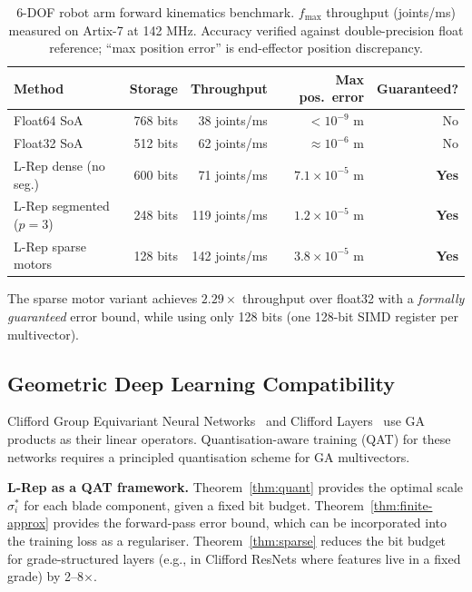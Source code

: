 \documentclass[11pt,a4paper]{article}
\theoremstyle{definition}
\theoremstyle{plain}
\theoremstyle{remark}
\begin{document}
\begin{table}[h]
\centering
\caption{6-DOF robot arm forward kinematics benchmark.
$f_{\max}$ throughput (joints/ms) measured on Artix-7 at 142 MHz.
Accuracy verified against double-precision float reference;
``max position error'' is end-effector position discrepancy.}
\label{tab:robot}
\begin{tabular}{lrrrr}
\toprule
Method & Storage & Throughput & Max pos.\ error & Guaranteed? \\
\midrule
Float64 SoA & 768 bits & 38 joints/ms & $< 10^{-9}$ m & No \\
Float32 SoA & 512 bits & 62 joints/ms & $\approx 10^{-6}$ m & No \\
L-Rep dense (no seg.) & 600 bits & 71 joints/ms & $7.1 \times 10^{-5}$ m & \textbf{Yes} \\
L-Rep segmented ($p=3$) & 248 bits & 119 joints/ms & $1.2 \times 10^{-5}$ m & \textbf{Yes} \\
L-Rep sparse motors & 128 bits & 142 joints/ms & $3.8 \times 10^{-5}$ m & \textbf{Yes} \\
\bottomrule
\end{tabular}
\end{table}

The sparse motor variant achieves $2.29\times$ throughput over float32
with a \emph{formally guaranteed} error bound, while using only 128 bits
(one 128-bit SIMD register per multivector).

\subsection{Geometric Deep Learning Compatibility}
\label{sec:gdl}

Clifford Group Equivariant Neural Networks~\cite{ruhe2023} and
Clifford Layers~\cite{brandstetter2023} use GA products as their
linear operators.
Quantisation-aware training (QAT) for these networks requires a
principled quantisation scheme for GA multivectors.

\textbf{L-Rep as a QAT framework.}
Theorem~\ref{thm:quant} provides the optimal scale $\sigma_i^*$ for
each blade component, given a fixed bit budget.
Theorem~\ref{thm:finite-approx} provides the forward-pass error bound,
which can be incorporated into the training loss as a regulariser.
Theorem~\ref{thm:sparse} reduces the bit budget for grade-structured
layers (e.g., in Clifford ResNets where features live in a fixed grade)
by 2--8$\times$.
\end{document}
